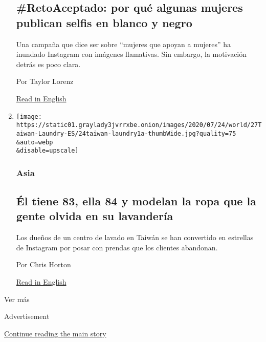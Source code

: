 \begin{enumerate}
  \hypertarget{retoaceptado-por-quuxe9-algunas-mujeres-publican-selfis-en-blanco-y-negro}{%
  \subsection{\#RetoAceptado: por qué algunas mujeres publican selfis en
  blanco y
  negro}\label{retoaceptado-por-quuxe9-algunas-mujeres-publican-selfis-en-blanco-y-negro}}

  Una campaña que dice ser sobre ``mujeres que apoyan a mujeres'' ha
  inundado Instagram con imágenes llamativas. Sin embargo, la motivación
  detrás es poco clara.

  Por Taylor Lorenz

  \href{https://www.nytimes3xbfgragh.onion/2020/07/27/style/challenge-accepted-instagram.html}{Read
  in English}
\item
  \href{/es/2020/07/28/espanol/mundo/lavanderia-taiwanesa-instagram.html}{}

  \texttt{[image: https://static01.graylady3jvrrxbe.onion/images/2020/07/24/world/27Taiwan-Laundry-ES/24taiwan-laundry1a-thumbWide.jpg?quality=75\\\&auto=webp\\\&disable=upscale]}

  \hypertarget{asia}{%
  \subsubsection{Asia}\label{asia}}

  \hypertarget{uxe9l-tiene-83-ella-84-y-modelan-la-ropa-que-la-gente-olvida-en-su-lavanderuxeda}{%
  \subsection{Él tiene 83, ella 84 y modelan la ropa que la gente olvida
  en su
  lavandería}\label{uxe9l-tiene-83-ella-84-y-modelan-la-ropa-que-la-gente-olvida-en-su-lavanderuxeda}}

  Los dueños de un centro de lavado en Taiwán se han convertido en
  estrellas de Instagram por posar con prendas que los clientes
  abandonan.

  Por Chris Horton

  \href{https://www.nytimes3xbfgragh.onion/2020/07/24/world/asia/taiwan-octogenarian-couple-instagram-laundry.html}{Read
  in English}
\end{enumerate}

Ver más

Advertisement

\protect\hyperlink{after-mid2}{Continue reading the main story}

